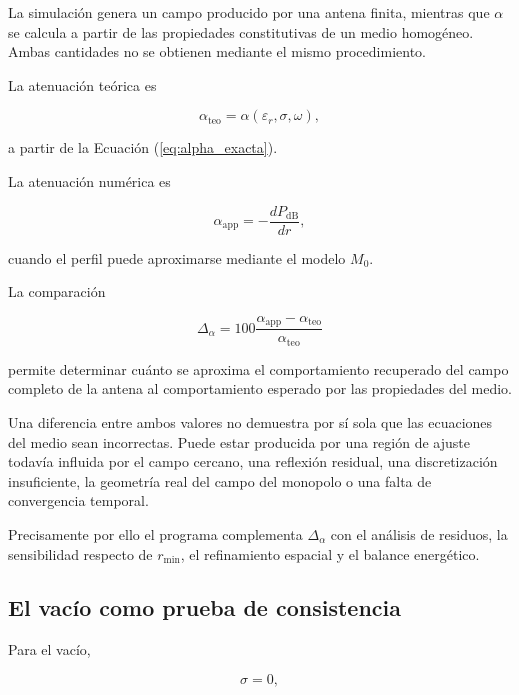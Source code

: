 La simulación genera un campo producido por una antena finita, mientras que $\alpha$ se calcula a partir de las propiedades constitutivas de un medio homogéneo. Ambas cantidades no se obtienen mediante el mismo procedimiento.

La atenuación teórica es

\begin{equation}
\alpha_{\mathrm{teo}}
=
\alpha
(\varepsilon_r,\sigma,\omega),
\end{equation}

a partir de la Ecuación (\ref{eq:alpha_exacta}).

La atenuación numérica es

\begin{equation}
\alpha_{\mathrm{app}}
=
-\frac{dP_{\mathrm{dB}}}{dr},
\end{equation}

cuando el perfil puede aproximarse mediante el modelo $M_0$.

La comparación

\begin{equation}
\Delta_\alpha
=
100
\frac{
\alpha_{\mathrm{app}}
-
\alpha_{\mathrm{teo}}
}{
\alpha_{\mathrm{teo}}
}
\label{eq:error_alpha}
\end{equation}

permite determinar cuánto se aproxima el comportamiento recuperado del campo completo de la antena al comportamiento esperado por las propiedades del medio.

Una diferencia entre ambos valores no demuestra por sí sola que las ecuaciones del medio sean incorrectas. Puede estar producida por una región de ajuste todavía influida por el campo cercano, una reflexión residual, una discretización insuficiente, la geometría real del campo del monopolo o una falta de convergencia temporal.

Precisamente por ello el programa complementa $\Delta_\alpha$ con el análisis de residuos, la sensibilidad respecto de $r_{\min}$, el refinamiento espacial y el balance energético.

\subsection{El vacío como prueba de consistencia}

Para el vacío,

\begin{equation}
\sigma=0,
\end{equation}

